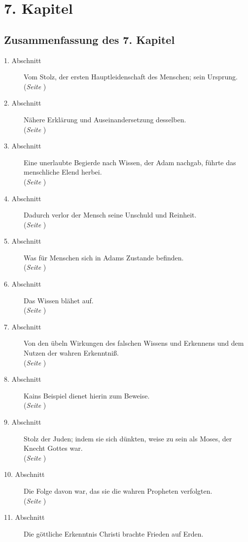 

\chapter{7. Kapitel} \label{kap7}

\section{Zusammenfassung des 7. Kapitel}
\footnotesize
\begin{description}
\item[1. Abschnitt] Vom Stolz, der ersten Hauptleidenschaft des Menschen; sein
Ursprung.
\\(\textit{Seite \pageref{kap7_ab1}})
\item[2. Abschnitt]  Nähere Erklärung und Auseinandersetzung desselben.
\\(\textit{Seite \pageref{kap7_ab2}})
\item[3. Abschnitt] Eine unerlaubte Begierde nach Wissen, der Adam nachgab,
führte das menschliche Elend herbei.
\\(\textit{Seite \pageref{kap7_ab3}})
\item[4. Abschnitt] Dadurch verlor der Mensch seine Unschuld und Reinheit.
\\(\textit{Seite \pageref{kap7_ab4}})
\item[5. Abschnitt] Was für Menschen sich in Adams Zustande befinden.
\\(\textit{Seite \pageref{kap7_ab5}})
\item[6. Abschnitt] Das Wissen blähet auf.
\\(\textit{Seite \pageref{kap7_ab6}})
\item[7. Abschnitt] Von den übeln Wirkungen des falschen Wissens und Erkennens
und dem Nutzen der wahren Erkenntniß.
\\(\textit{Seite \pageref{kap7_ab7}})
\item[8. Abschnitt] Kains Beispiel dienet hierin zum Beweise.
\\(\textit{Seite \pageref{kap7_ab8}})
\item[9. Abschnitt] Stolz der Juden; indem sie sich dünkten, weise zu sein als
Moses, der Knecht Gottes war.
\\(\textit{Seite \pageref{kap7_ab9}})
\item[10. Abschnitt] Die Folge davon war, das sie die wahren Propheten
verfolgten.
\\(\textit{Seite \pageref{kap7_ab10}})
\item[11. Abschnitt] Die göttliche Erkenntnis Christi brachte Frieden auf Erden.

\end{description}
